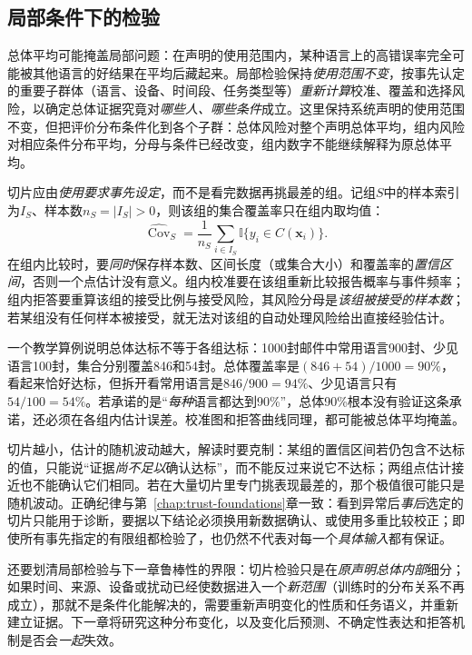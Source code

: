 \subsection{局部条件下的检验}
\label{sec:reliability-conditional-evaluation}

总体平均可能掩盖局部问题：在声明的使用范围内，某种语言上的高错误率完全可能被其他语言的好结果在平均后藏起来。局部检验保持\emph{使用范围不变}，按事先认定的重要子群体（语言、设备、时间段、任务类型等）\emph{重新计算}校准、覆盖和选择风险，以确定总体证据究竟对\emph{哪些人、哪些条件}成立。这里保持系统声明的使用范围不变，但把评价分布条件化到各个子群：总体风险对整个声明总体平均，组内风险对相应条件分布平均，分母与条件已经改变，组内数字不能继续解释为原总体平均。

切片应由\emph{使用要求事先设定}，而不是看完数据再挑最差的组。记组$S$中的样本索引为$I_S$、样本数$n_S=|I_S|>0$，则该组的集合覆盖率只在组内取均值：
\begin{equation}
 \widehat{\operatorname{Cov}}_S
 =\frac1{n_S}\sum_{i\in I_S}
   \mathbb I\{y_i\in C(\bm{x}_i)\}.
 \label{eq:reliability-group-coverage}
\end{equation}
在组内比较时，要\emph{同时}保存样本数、区间长度（或集合大小）和覆盖率的\emph{置信区间}，否则一个点估计没有意义。组内校准要在该组重新比较报告概率与事件频率；组内拒答要重算该组的接受比例与接受风险，其风险分母是\emph{该组被接受的样本数}；若某组没有任何样本被接受，就无法对该组的自动处理风险给出直接经验估计。

一个教学算例说明总体达标不等于各组达标：1000封邮件中常用语言900封、少见语言100封，集合分别覆盖846和54封。总体覆盖率是$(846+54)/1000=90\%$，看起来恰好达标，但拆开看常用语言是$846/900=94\%$、少见语言只有$54/100=54\%$。若承诺的是“\emph{每种}语言都达到90\%”，总体90\%根本没有验证这条承诺，还必须在各组内估计误差。校准图和拒答曲线同理，都可能被总体平均掩盖。

切片越小，估计的随机波动越大，解读时要克制：某组的置信区间若仍包含不达标的值，只能说“证据\emph{尚不足以}确认达标”，而不能反过来说它不达标；两组点估计接近也不能确认它们相同。若在大量切片里专门挑表现最差的，那个极值很可能只是随机波动。正确纪律与第~\ref{chap:trust-foundations}章一致：看到异常后\emph{事后}选定的切片只能用于诊断，要据以下结论必须换用新数据确认、或使用多重比较校正；即使所有事先指定的有限组都检验了，也仍然不代表对每一个\emph{具体输入}都有保证。

还要划清局部检验与下一章鲁棒性的界限：切片检验只是在\emph{原声明总体内部}细分；如果时间、来源、设备或扰动已经使数据进入一个\emph{新范围}（训练时的分布关系不再成立），那就不是条件化能解决的，需要重新声明变化的性质和任务语义，并重新建立证据。下一章将研究这种分布变化，以及变化后预测、不确定性表达和拒答机制是否会\emph{一起}失效。

